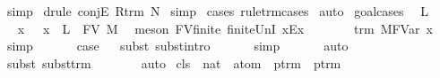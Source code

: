 \begin{isabellebody}
\isamarkupfalse%
\ simp\isanewline
{}\isamarkupfalse%
\ {\isacharparenleft}drule\ conjE{\isacharbrackleft}\ R{\isacharequal}{\isachardoublequoteopen}trm\ N{\isachardoublequoteclose}{\isacharbrackright}{\isacharparenright}\isanewline
{}\isamarkupfalse%
\ simp\isanewline
{}\isamarkupfalse%
\ {\isacharparenleft}cases\ rule{\isacharcolon}trm{\isachardot}cases{\isacharparenright}\isanewline
{}\isamarkupfalse%
\ auto\isanewline
{}\isamarkupfalse%
\ goal{\isacharunderscore}cases\isanewline
{}\isamarkupfalse%
\ {\isacharparenleft}{}\ L{\isacharparenright}\ \isanewline
\ \ \isamarkupfalse%
\ \isamarkupfalse%
\ x\ \ {}{\isacharcolon}\ {\isachardoublequoteopen}x\ {\isasymnotin}\ L\ {\isasymunion}\ FV\ M{\isachardoublequoteclose}\ \isamarkupfalse%
\ {\isacharparenleft}meson\ FV{\isacharunderscore}finite\ finite{\isacharunderscore}UnI\ x{\isacharunderscore}Ex{\isacharparenright}\isanewline
\ \ \isamarkupfalse%
\ {}\ \isamarkupfalse%
\ {}{\isacharcolon}\ {\isachardoublequoteopen}trm\ M{\isacharcircum}FVar\ x{\isachardoublequoteclose}\ \isamarkupfalse%
\ simp\isanewline
\ \ \isanewline
\ \ \isamarkupfalse%
\ {\isacharquery}case\isanewline
\ \ \isamarkupfalse%
{\isacharparenleft}subst\ subst{\isacharunderscore}intro{}{\isacharparenright}\isanewline
\ \ \isamarkupfalse%
\ {}\ \isamarkupfalse%
\ simp\isanewline
\ \ \isamarkupfalse%
\ {}\ \isamarkupfalse%
\ auto{\isacharbrackleft}{}{\isacharbrackright}\isanewline
\ \ \isamarkupfalse%
\ {\isacharparenleft}subst\ subst{\isacharunderscore}trm{\isacharparenright}\isanewline
\ \ \isamarkupfalse%
\ {}\ {}\ \isamarkupfalse%
\ auto\isanewline
{}\isamarkupfalse%
%
\endisatagproof
{\isafoldproof}%
%
\isadelimproof
%
\endisadelimproof
%
\isamarkuptrue%
\isamarkupfalse%
\ cls\ {\isacharcolon}{\isacharcolon}\ {\isachardoublequoteopen}nat\ {\isasymRightarrow}\ atom\ {\isasymRightarrow}\ ptrm\ {\isasymRightarrow}\ ptrm{\isachardoublequoteclose}\ {\isacharparenleft}{\isachardoublequoteopen}{\isacharbraceleft}{\isacharunderscore}\ {\isacharless}{\isacharminus}\ {\isacharunderscore}{\isacharbraceright}\ {\isacharunderscore}{\isachardoublequoteclose}{\isacharparenright}\ \ \isanewline

\end{isabellebody}
